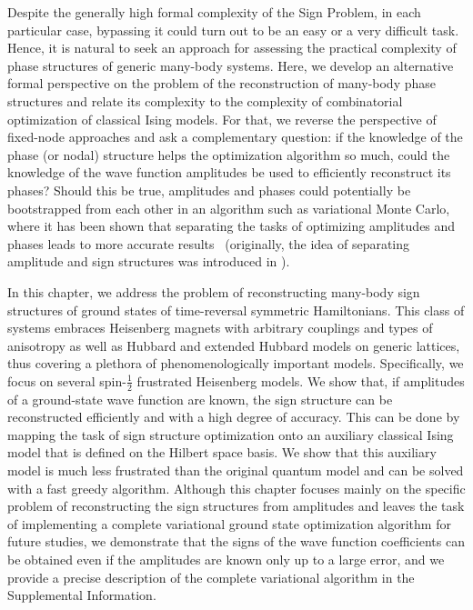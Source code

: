 Despite the generally high formal complexity of the Sign Problem, in each particular case, bypassing it could turn out to be an easy or a very difficult task. Hence, it is natural to seek an approach for assessing the practical complexity of phase structures of generic many-body systems. Here, we develop an alternative formal perspective on the problem of the reconstruction of many-body phase structures and relate its complexity to the complexity of combinatorial optimization of classical Ising models. For that, we reverse the perspective of fixed-node approaches and ask a complementary question: if the knowledge of the phase (or nodal) structure helps the optimization algorithm so much, could the knowledge of the wave function amplitudes be used to efficiently reconstruct its phases? Should this be true, amplitudes and phases could potentially be bootstrapped from each other in an algorithm such as variational Monte Carlo, where it has been shown that separating the tasks of optimizing amplitudes and phases leads to more accurate results~\cite{astrakhantsev2021} (originally, the idea of separating amplitude and sign structures was introduced in \cite{torlai2018neural}).

In this chapter, we address the problem of reconstructing many-body sign structures of ground states of time-reversal symmetric Hamiltonians. This class of systems embraces Heisenberg magnets with arbitrary couplings and types of anisotropy as well as Hubbard and extended Hubbard models on generic lattices, thus covering a plethora of phenomenologically important models. Specifically, we focus on several spin-$\frac12$ frustrated Heisenberg models. We show that, if amplitudes of a ground-state wave function are known, the sign structure can be reconstructed efficiently and with a high degree of accuracy. This can be done by mapping the task of sign structure optimization onto an auxiliary classical Ising model that is defined on the Hilbert space basis. We show that this auxiliary model is much less frustrated than the original quantum model and can be solved with a fast greedy algorithm. Although this chapter focuses mainly on the specific problem of reconstructing the sign structures from amplitudes and leaves the task of implementing a complete variational ground state optimization algorithm for future studies, we demonstrate that the signs of the wave function coefficients can be obtained even if the amplitudes are known only up to a large error, and we provide a precise description of the complete variational algorithm in the Supplemental Information.

